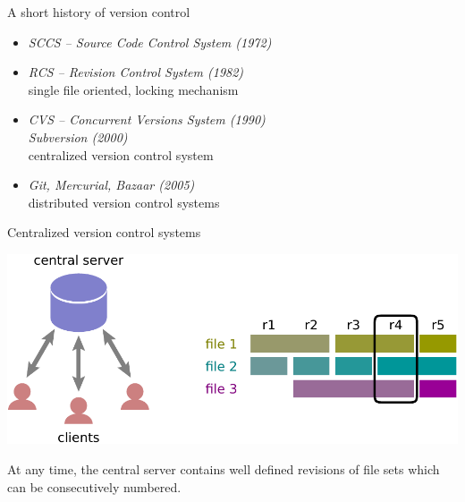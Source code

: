 \documentclass[svgnames]{beamer}
\begin{document}
\begin{frame}{A short history of version control}
 \begin{itemize}
  \item \textit{SCCS -- Source Code Control System (1972)}
  \item \textit{RCS -- Revision Control System (1982)}\\
	single file oriented, locking mechanism
  \item \textit{CVS -- Concurrent Versions System (1990)}\\
	\textit{Subversion (2000)}\\
	centralized version control system
  \item \textit{\alert<2>{Git}, Mercurial, Bazaar (2005)}\\
	distributed version control systems
 \end{itemize}

 \begin{center}
 \end{center}
\end{frame}

\begin{frame}{Centralized version control systems}
 \begin{center}
  \includegraphics[width=\textwidth]{cvcs}
 \end{center}

 At any time, the central server contains well defined revisions
 of file sets which can be consecutively numbered.
\end{frame}
\end{document}
